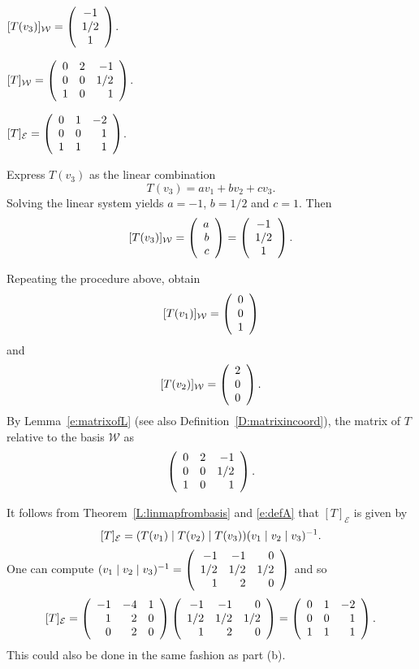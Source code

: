 \documentclass{ximera}
\begin{document}
\begin{exercise}
\begin{solution}
\ans
\begin{enumeratea}%
\item $[T(v_3)]_\mathcal{W} = \left(\begin{array}{cccccccccccc} -1 \\ 1/2\\ 1 \end{array}\right)$.
\item $[T]_{\mathcal{W}}=\left(\begin{array}{rrrrrrrrrrrrrrrrrr}  0& 2& -1\\ 0& 0& 1/2\\ 1& 0& 1 \end{array}\right)$.
\item $[T]_{\mathcal{E}}=\left(\begin{array}{rrrrrrrrrrrrrrrrrr} 0&1&-2 \\ 0&0& 1\\ 1&1&1 \end{array}\right)$.
\end{enumeratea}
\soln  
\begin{enumeratea}%
\item Express $T(v_3)$ as the linear combination 
\[
T(v_3) = a v_1 + bv_2 + cv_3.
\]
Solving the linear system yields $a=-1$, $b=1/2$ and $c=1$.  Then 
\[
[T(v_3)]_\mathcal{W} = \left(\begin{array}{rrrrrrrrrrrrrrrrrr} a\\b\\c \end{array}\right) = \left(\begin{array}{cccccccccccc} -1 \\ 1/2\\ 1 \end{array}\right)\ldotp
\]
\item Repeating the procedure above, obtain
\[
[T(v_1)]_\mathcal{W} = \left(\begin{array}{rrrrrrrrrrrrrrrrrr} 0\\0\\1 \end{array}\right)
\]
and
\[
 [T(v_2)]_{\mathcal{W}} = \left(\begin{array}{rrrrrrrrrrrrrrrrrr} 2\\0\\0 \end{array}\right)\ldotp
\]
By Lemma~\ref{e:matrixofL} (see also Definition~\ref{D:matrixincoord}), the matrix of $T$ relative to the basis $\mathcal{W}$ as
\[
\left(\begin{array}{rrrrrrrrrrrrrrrrrr}  0& 2& -1\\ 0& 0& 1/2\\ 1& 0& 1 \end{array}\right)\ldotp
\]
\item It follows from Theorem~\ref{L:linmapfrombasis} and \eqref{e:defA} that $[T]_{\mathcal{E}}$ is given by 
\[
[T]_\mathcal{E}=(T(v_1)\mid T(v_2) \mid T(v_3))(v_1\mid v_2\mid v_3)^{-1}\ldotp
\]
One can compute $(v_1\mid v_2\mid v_3)^{-1}=\left(\begin{array}{rrrrrrrrrrrrrrrrrr}  -1 & -1 & 0 \\ 1/2 & 1/2 & 1/2 \\
 1 & 2 & 0 \end{array}\right)$ and so 
 \[
 [T]_\mathcal{E}=\left(\begin{array}{rrrrrrrrrrrrrrrrrr}  -1 & -4 & 1 \\ 1 & 2 & 0 \\ 0 & 2 & 0 \end{array}\right)\left(\begin{array}{rrrrrrrrrrrrrrrrrr}  -1 & -1 & 0 \\ 1/2 & 1/2& 1/2 \\ 1 & 2 & 0 \end{array}\right)=\left(\begin{array}{rrrrrrrrrrrrrrrrrr} 0&1&-2 \\ 0&0& 1\\ 1&1&1 \end{array}\right)\ldotp
 \]
 This could also be done in the same fashion as part (b).
 \end{enumeratea}
\end{solution}
\end{exercise}
\end{document}
